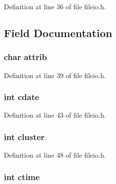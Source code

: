 Definition at line 36 of file fileio.\-h.



\subsection{Field Documentation}
\hypertarget{struct_d_i_r_t_a_b_l_e_a0a0fb8303adbd7c1a299c21f7f6413f7}{
\subsubsection[{attrib}]{\setlength{\rightskip}{0pt plus 5cm}char attrib}}\label{struct_d_i_r_t_a_b_l_e_a0a0fb8303adbd7c1a299c21f7f6413f7}


Definition at line 39 of file fileio.\-h.

\hypertarget{struct_d_i_r_t_a_b_l_e_a6f490e2d87432f86a1de3bff5b0b5180}{
\subsubsection[{cdate}]{\setlength{\rightskip}{0pt plus 5cm}int cdate}}\label{struct_d_i_r_t_a_b_l_e_a6f490e2d87432f86a1de3bff5b0b5180}


Definition at line 43 of file fileio.\-h.

\hypertarget{struct_d_i_r_t_a_b_l_e_a774dae89cbfb6551d93d30cf922ac733}{
\subsubsection[{cluster}]{\setlength{\rightskip}{0pt plus 5cm}int cluster}}\label{struct_d_i_r_t_a_b_l_e_a774dae89cbfb6551d93d30cf922ac733}


Definition at line 48 of file fileio.\-h.

\hypertarget{struct_d_i_r_t_a_b_l_e_a1adf6ceffc2702e2fe8df332684baafa}{
\subsubsection[{ctime}]{\setlength{\rightskip}{0pt plus 5cm}int ctime}}\label{struct_d_i_r_t_a_b_l_e_a1adf6ceffc2702e2fe8df332684baafa}


